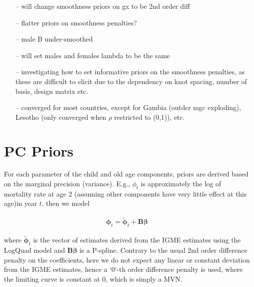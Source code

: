 \documentclass[12pt,a4paper]{article}
\begin{document}
\begin{itemize}
\begin{itemize}
\begin{itemize}
	\end{itemize}
\item[--] will change smoothness priors on gx to be 2nd order diff
\item[--] flatter priors on smoothness penalties? 
\item[--] male B under-smoothed
\item[--] will set males and females lambda to be the same
\item[--] investigating how to set informative priors on the smoothness penalties, as these are difficult to elicit due to the dependency on knot spacing, number of basis, design matrix etc.
\item[--] converged for most countries, except for Gambia (outder mgc exploding), Lesotho (only converged when $\rho$ restricted to (0,1)), etc.
	\end{itemize}
\end{itemize}

\section*{PC Priors}
For each parameter of the child and old age components, priors are derived based on the marginal precision (variance). E.g., $\phi_t$ is approximately the log of mortality rate at age $2$ (assuming other components have very little effect at this age)in year $t$, then we model

\begin{align*}
\boldsymbol{\phi}_t = \boldsymbol{\tilde{\phi}}_t + \boldsymbol{B\beta}
\end{align*} 

 where $\boldsymbol{\tilde{\phi}}_t$ is the vector of estimates derived from the IGME estimates using the LogQuad model and $\boldsymbol{B\beta}$ is a P-spline. Contrary to the usual 2nd order difference penalty on the coefficients, here we do not expect any linear or constant deviation from the IGME estimates, hence a `0`-th order difference penalty is used, where the limiting curve is constant at 0, which is simply a MVN.
\end{document}
